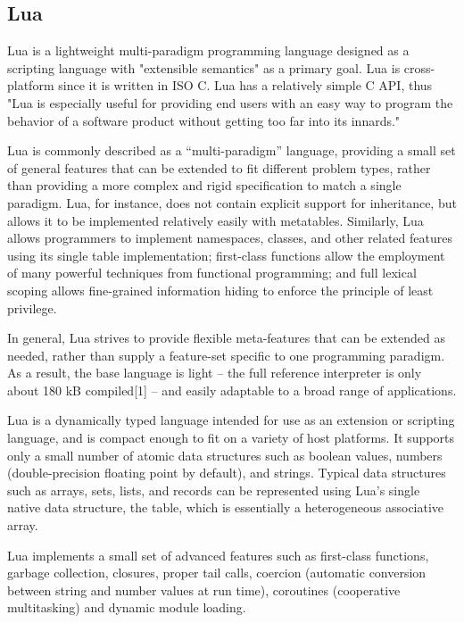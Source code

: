 \newpage
\subsection{Lua}

Lua is a lightweight multi-paradigm programming language designed as a scripting language with "extensible semantics" as a primary goal. Lua is cross-platform since it is written in ISO C. Lua has a relatively simple C API, thus "Lua is especially useful for providing end users with an easy way to program the behavior of a software product without getting too far into its innards."

\vpara
Lua is commonly described as a “multi-paradigm” language, providing a small set of general features that can be extended to fit different problem types, rather than providing a more complex and rigid specification to match a single paradigm. Lua, for instance, does not contain explicit support for inheritance, but allows it to be implemented relatively easily with metatables. Similarly, Lua allows programmers to implement namespaces, classes, and other related features using its single table implementation; first-class functions allow the employment of many powerful techniques from functional programming; and full lexical scoping allows fine-grained information hiding to enforce the principle of least privilege.

\vpara
In general, Lua strives to provide flexible meta-features that can be extended as needed, rather than supply a feature-set specific to one programming paradigm. As a result, the base language is light – the full reference interpreter is only about 180 kB compiled[1] – and easily adaptable to a broad range of applications.

\vpara
Lua is a dynamically typed language intended for use as an extension or scripting language, and is compact enough to fit on a variety of host platforms. It supports only a small number of atomic data structures such as boolean values, numbers (double-precision floating point by default), and strings. Typical data structures such as arrays, sets, lists, and records can be represented using Lua’s single native data structure, the table, which is essentially a heterogeneous associative array.

\vpara
Lua implements a small set of advanced features such as first-class functions, garbage collection, closures, proper tail calls, coercion (automatic conversion between string and number values at run time), coroutines (cooperative multitasking) and dynamic module loading.


